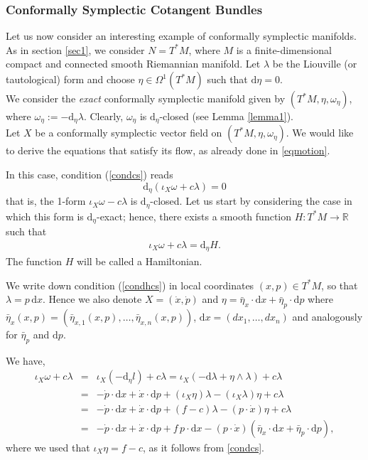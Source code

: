 \documentclass[11pt]{article}
\theoremstyle{definition}
\def\d{\mathrm{d}}
\begin{document}
\bigskip

\subsubsection{Conformally Symplectic Cotangent Bundles} 

Let us now consider an interesting example of conformally symplectic manifolds. As in section \ref{sec1}, we consider $N=T^*M$, where
$M$ is a finite-dimensional compact and connected smooth Riemannian manifold. Let $\lambda$ be the Liouville (or tautological) form and choose
$\eta \in \Omega^1(T^*M)$ such that $\d \eta =0$. \\

\noindent We consider the {\it exact} conformally symplectic manifold given by $(T^*M, \eta, \omega_\eta)$, where $\omega_\eta:= -\d_\eta \lambda$. Clearly, $\omega_\eta$ is $\d_\eta$-closed (see Lemma \ref{lemma1}).\\

\noindent Let $X$ be a conformally symplectic vector field on $(T^*M, \eta, \omega_\eta)$. We would like to derive the equations that satisfy its flow, as already done in \eqref{eqmotion}.

In this case, condition (\ref{condcs}) reads
 \begin{equation}
 \d_\eta( \iota_X\omega + c\lambda) =0
 \end{equation}
 that is, the 1-form $\iota_X\omega -c\lambda$ is $\d_\eta$-closed.
 Let us start by considering the case in which this form is $\d_\eta$-exact; hence, there exists a smooth
function $H:T^*M\rightarrow{\mathbb R}$ such that
  \begin{align}
    \label{condhcs}
    \iota_X\omega + c\lambda =\d_\eta H. 
  \end{align}
The function $H$ will be called a Hamiltonian.\\
\medskip

We write down condition (\ref{condhcs}) in local coordinates $(x,p)\in T^*M$, so that $\lambda =p\, \d x$. Hence we also denote $X=(\dot{x},\dot{p})$ and $\eta = \bar{\eta}_x \cdot \d x + \bar{\eta}_p \cdot \d p$ where $\bar{\eta}_x(x,p) = (\bar{\eta}_{x,1}(x,p),\dots,\bar{\eta}_{x,n}(x,p))$, $\d x =(dx_1,\dots, dx_n)$ and analogously for $\bar{\eta}_p$ and $\d p$.

We have,
\begin{eqnarray}\label{oneside}
 \iota_X\omega + c\lambda & = & \iota_X(-\d_\eta l) + c\lambda = \iota_X(-\d\lambda + \eta\wedge\lambda ) + c\lambda \nonumber\\
 & =& -\dot{p} \cdot \d x +\dot{x}\cdot \d p + (\iota_X\eta) \lambda - (\iota_X\lambda) \eta + c\lambda \nonumber\\
 & =& -\dot{p} \cdot \d x +\dot{x}\cdot \d p + (f-c) \lambda - (p\cdot\dot{x}) \eta + c\lambda \nonumber\\
 & =& -\dot{p} \cdot \d x +\dot{x}\cdot \d p + f\, p \cdot \d x - (p\cdot\dot{x}) (\bar{\eta}_x \cdot \d x + \bar{\eta}_p \cdot \d p),
\end{eqnarray}
where we used that $\iota_X\eta = f-c$, as it follows from \eqref{condcs}.\\
\end{document}
